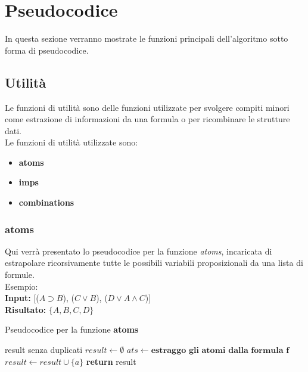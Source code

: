 \documentclass[\main/tesi.tex]{subfiles}
\begin{document}
\chapter{Pseudocodice}

In questa sezione verranno mostrate le funzioni principali dell'algoritmo sotto forma di pseudocodice.

\section{Utilità}

Le funzioni di utilità sono delle funzioni utilizzate per svolgere compiti minori come estrazione di informazioni da una formula o per ricombinare le strutture dati. \\

Le funzioni di utilità utilizzate sono:
\begin{itemize}
    \item \textbf{atoms}
    \item \textbf{imps}
    \item \textbf{combinations}
\end{itemize}

\newpage

\subsection{atoms}
Qui verrà presentato lo pseudocodice per la funzione \textit{atoms}, incaricata di estrapolare ricorsivamente tutte le possibili variabili proposizionali da una lista di formule. \\
Esempio: \\
\textbf{Input:} [($A \supset B$), ($C \lor B$), ($D \lor A \land C$)] \\
\textbf{Risultato:} $\{A, B, C, D\}$

\begin{algorithm}
    \caption{Pseudocodice per la funzione \textbf{atoms}}\label{alg:atoms}
    \begin{algorithmic}
        \Ensure result senza duplicati
        \State $result \gets \emptyset$
        \State $ats \gets \textbf{estraggo gli atomi dalla formula f}$
        \State $result \gets result \cup \{a\}$
        \EndIf
        \EndFor
        \EndFor
        \State \textbf{return} result
        \EndFunction
    \end{algorithmic}
\end{algorithm}
\end{document}

